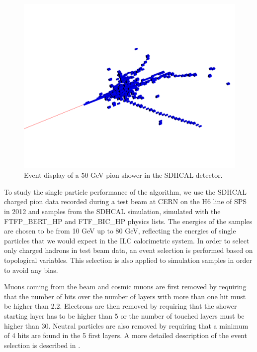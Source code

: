 \documentclass[cits]{JINST}
\begin{document}
\begin{figure}
  \vspace{-20pt}
  \begin{center}
    \includegraphics[width=\linewidth]{SingleParticleSetup.pdf}
  \end{center}
  \vspace{-10pt}
  \caption{\label{ARBOR_SINGLE_PARTICLE_SETUP} Event display of a 50 GeV pion shower in the SDHCAL detector.}
\end{figure}

To study the single particle performance of the algorithm, we use the SDHCAL charged pion data recorded during a test beam at CERN on the H6 line of SPS in 2012 and samples from the SDHCAL simulation, simulated with the FTFP\_BERT\_HP and FTF\_BIC\_HP physics lists. The energies of the samples are chosen to be from 10 GeV up to 80 GeV, reflecting the energies of single particles that we would expect in the ILC calorimetric system. 
In order to select only charged hadrons in test beam data, an event selection is performed based on topological variables. This selection is also applied to simulation samples in order to avoid any bias. 

Muons coming from the beam and cosmic muons are first removed by requiring that the number of hits over the number of layers with more than one hit must be higher than 2.2. Electrons are then removed by requiring that the shower starting layer has to be higher than 5 or the number of touched layers must be higher than 30. Neutral particles are also removed by requiring that a minimum of 4 hits are found in the 5 first layers. A more detailed description of the event selection is described in \cite{sdhcal-paper}.
\end{document}
